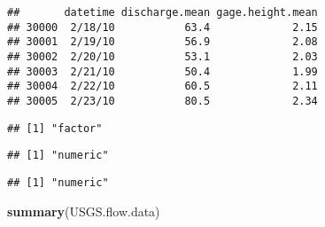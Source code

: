 \documentclass[]{article}
\newenvironment{Shaded}{\begin{snugshade}}{\end{snugshade}}
\newcommand{\KeywordTok}[1]{\textcolor[rgb]{0.13,0.29,0.53}{\textbf{#1}}}
\newcommand{\OperatorTok}[1]{\textcolor[rgb]{0.81,0.36,0.00}{\textbf{#1}}}
\newcommand{\NormalTok}[1]{#1}
\begin{document}
\begin{verbatim}
##       datetime discharge.mean gage.height.mean
## 30000  2/18/10           63.4             2.15
## 30001  2/19/10           56.9             2.08
## 30002  2/20/10           53.1             2.03
## 30003  2/21/10           50.4             1.99
## 30004  2/22/10           60.5             2.11
## 30005  2/23/10           80.5             2.34
\end{verbatim}

\begin{Shaded}
\end{Shaded}

\begin{verbatim}
## [1] "factor"
\end{verbatim}

\begin{Shaded}
\end{Shaded}

\begin{verbatim}
## [1] "numeric"
\end{verbatim}

\begin{Shaded}
\end{Shaded}

\begin{verbatim}
## [1] "numeric"
\end{verbatim}

\begin{Shaded}
\begin{Highlighting}[]
\KeywordTok{summary}\NormalTok{(USGS.flow.data)}
\end{Highlighting}
\end{Shaded}
\end{document}
